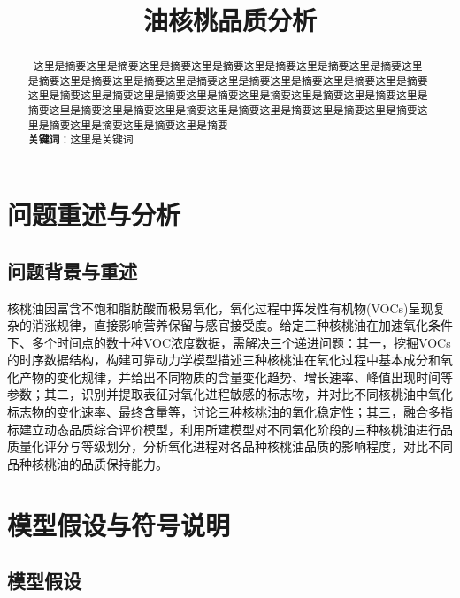 \documentclass[10pt, a4paper, oneside]{ctexart}
\title{\textbf{油核桃品质分析}}
\date{}
\begin{document}
\maketitle

\setcounter{page}{0}
\thispagestyle{empty}

\begin{abstract}
    {\fontsize{10}{15}\selectfont\
    这里是摘要这里是摘要这里是摘要这里是摘要这里是摘要这里是摘要这里是摘要这里是摘要这里是摘要这里是摘要这里是摘要这里是摘要这里是摘要这里是摘要这里是摘要这里是摘要这里是摘要这里是摘要这里是摘要这里是摘要这里是摘要这里是摘要这里是摘要这里是摘要这里是摘要这里是摘要这里是摘要这里是摘要这里是摘要这里是摘要这里是摘要这里是摘要这里是摘要这里是摘要 \\
    \textbf{关键词}：这里是关键词}
\end{abstract}

\newpage

\section{问题重述与分析}
\subsection{问题背景与重述}
核桃油因富含不饱和脂肪酸而极易氧化，氧化过程中挥发性有机物(VOCs)呈现复杂的消涨规律，直接影响营养保留与感官接受度。给定三种核桃油在加速氧化条件下、多个时间点的数十种VOC浓度数据，需解决三个递进问题：其一，挖掘VOCs的时序数据结构，构建可靠动力学模型描述三种核桃油在氧化过程中基本成分和氧化产物的变化规律，并给出不同物质的含量变化趋势、增长速率、峰值出现时间等参数；其二，识别并提取表征对氧化进程敏感的标志物，并对比不同核桃油中氧化标志物的变化速率、最终含量等，讨论三种核桃油的氧化稳定性；其三，融合多指标建立动态品质综合评价模型，利用所建模型对不同氧化阶段的三种核桃油进行品质量化评分与等级划分，分析氧化进程对各品种核桃油品质的影响程度，对比不同品种核桃油的品质保持能力。

\section{模型假设与符号说明}

\subsection{模型假设}
\end{document}
